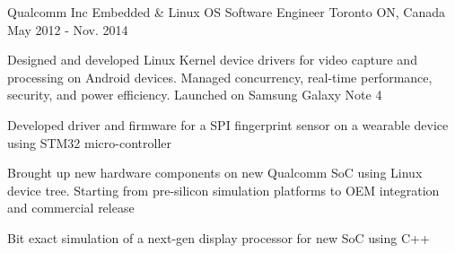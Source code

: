 \begin{cventries}
  \cventry
    {Qualcomm Inc} %
	{Embedded \& Linux OS Software Engineer} %
    {Toronto ON, Canada} %
    {May 2012 - Nov. 2014} %
    {
      \begin{cvitems} %
        \item {Designed and developed Linux Kernel device drivers for video capture and processing on Android devices. Managed concurrency, real-time performance, security, and power efficiency. Launched on Samsung Galaxy Note 4}
        \item {Developed driver and firmware for a SPI fingerprint sensor on a wearable device using STM32 micro-controller}
        \item {Brought up new hardware components on new Qualcomm SoC using Linux device tree. Starting from  pre-silicon simulation platforms to OEM integration and commercial release}
        \item {Bit exact simulation of a next-gen display processor for new SoC using C++}
      \end{cvitems}
    }


\end{cventries}
